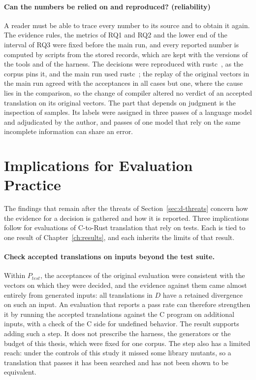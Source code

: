 \paragraph{Can the numbers be relied on and reproduced? (reliability)} A reader must be able to trace every number to its source and to obtain it again. The evidence rules, the metrics of RQ1 and RQ2 and the lower end of the interval of RQ3 were fixed before the main run, and every reported number is computed by scripts from the stored records, which are kept with the versions of the tools and of the harness. The decisions were reproduced with rustc~\sEnvRustcCorpus{}, as the corpus pins it, and the main run used rustc~\sEnvRustc{}; the replay of the original vectors in the main run agreed with the acceptances in all cases but one, where the cause lies in the comparison, so the change of compiler altered no verdict of an accepted translation on its original vectors. The part that depends on judgment is the inspection of samples. Its labels were assigned in three passes of a language model and adjudicated by the author, and passes of one model that rely on the same incomplete information can share an error.

\section{Implications for Evaluation Practice}\label{sec:d-implications}

The findings that remain after the threats of Section~\ref{sec:d-threats} concern how the evidence for a decision is gathered and how it is reported. Three implications follow for evaluations of C-to-Rust translation that rely on tests. Each is tied to one result of Chapter~\ref{ch:results}, and each inherits the limits of that result.

\paragraph{Check accepted translations on inputs beyond the test suite.} Within $P_{\mathit{test}}$, the acceptances of the original evaluation were consistent with the vectors on which they were decided, and the evidence against them came almost entirely from generated inputs: all translations in $D$ have a retained divergence on such an input. An evaluation that reports a pass rate can therefore strengthen it by running the accepted translations against the C program on additional inputs, with a check of the C side for undefined behavior. The result supports adding such a step. It does not prescribe the harness, the generators or the budget of this thesis, which were fixed for one corpus. The step also has a limited reach: under the controls of this study it missed some library mutants, so a translation that passes it has been searched and has not been shown to be equivalent.

